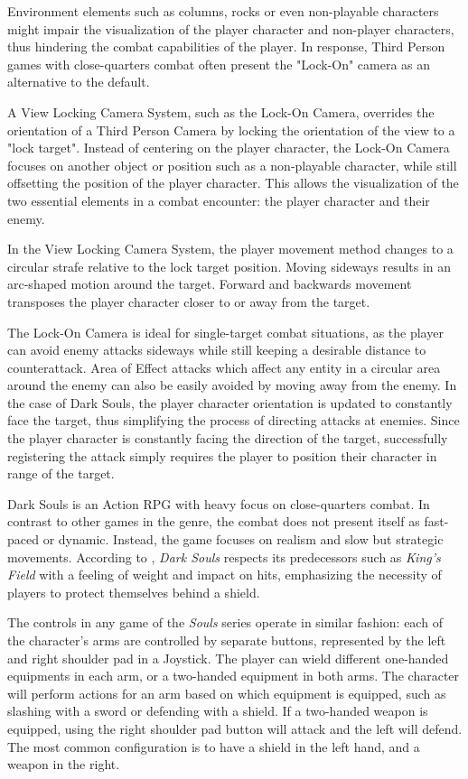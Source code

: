 Environment elements such as columns, rocks or even non-playable characters might impair the visualization of the player character and non-player characters, thus hindering the combat capabilities of the player. In response, Third Person games with close-quarters combat often present the "Lock-On" camera as an alternative to the default.

A View Locking Camera System, such as the Lock-On Camera, overrides the orientation of a Third Person Camera by locking the orientation of the view to a "lock target". Instead of centering on the player character, the Lock-On Camera focuses on another object or position such as a non-playable character, while still offsetting the position of the player character. This allows the visualization of the two essential elements in a combat encounter: the player character and their enemy.

In the View Locking Camera System, the player movement method changes to a circular strafe relative to the lock target position. Moving sideways results in an arc-shaped motion around the target. Forward and backwards movement transposes the player character closer to or away from the target.

The Lock-On Camera is ideal for single-target combat situations, as the player can avoid enemy attacks sideways while still keeping a desirable distance to counterattack. Area of Effect attacks which affect any entity in a circular area around the enemy can also be easily avoided by moving away from the enemy. In the case of Dark Souls, the player character orientation is updated to constantly face the target, thus simplifying the process of directing attacks at enemies. Since the player character is constantly facing the direction of the target, successfully registering the attack simply requires the player to position their character in range of the target.

Dark Souls is an Action RPG with heavy focus on close-quarters combat. In contrast to other games in the genre, the combat does not present itself as fast-paced or dynamic. Instead, the game focuses on realism and slow but strategic movements. According to \cite{BOOK_DarkSoulsBeyondTheGrave}, \emph{Dark Souls} respects its predecessors such as \emph{King's Field} with a feeling of weight and impact on hits, emphasizing the necessity of players to protect themselves behind a shield.

The controls in any game of the \emph{Souls} series operate in similar fashion: each of the character's arms are controlled by separate buttons, represented by the left and right shoulder pad in a Joystick. The player can wield different one-handed equipments in each arm, or a two-handed equipment in both arms. The character will perform actions for an arm based on which equipment is equipped, such as slashing with a sword or defending with a shield. If a two-handed weapon is equipped, using the right shoulder pad button will attack and the left will defend. The most common configuration is to have a shield in the left hand, and a weapon in the right.

